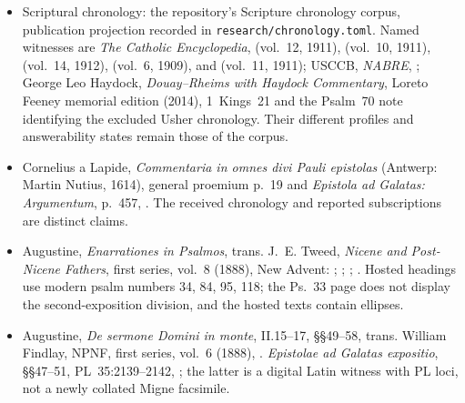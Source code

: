 {\begin{itemize}[leftmargin=1.1em,labelsep=0.35em,itemsep=0.22em,topsep=0.15em,parsep=0pt]
\item Scriptural chronology: the repository's Scripture chronology corpus,
publication projection recorded in \nolinkurl{research/chronology.toml}.
Named witnesses are \emph{The Catholic Encyclopedia},
 (vol.~12, 1911),
(vol.~10, 1911),
(vol.~14, 1912),
(vol.~6, 1909), and
(vol.~11, 1911); USCCB, \emph{NABRE},
;
George Leo Haydock, \emph{Douay--Rheims with Haydock Commentary}, Loreto
Feeney memorial edition (2014), 1~Kings~21 and the Psalm~70 note identifying
the excluded Usher chronology. Their different profiles and answerability
states remain those of the corpus.

\item Cornelius a Lapide, \emph{Commentaria in omnes divi Pauli epistolas}
(Antwerp: Martin Nutius, 1614), general proemium p.~19 and
\emph{Epistola ad Galatas: Argumentum}, p.~457,
.
The received chronology and reported subscriptions are distinct claims.

\item Augustine, \emph{Enarrationes in Psalmos}, trans. J.~E. Tweed,
\emph{Nicene and Post-Nicene Fathers}, first series, vol.~8 (1888),
New Advent: ;
;
;
.
Hosted headings use modern psalm numbers 34, 84, 95, 118; the Ps.~33 page
does not display the second-exposition division, and the hosted texts contain
ellipses.

\item Augustine, \emph{De sermone Domini in monte}, II.15--17, §§49--58,
trans. William Findlay, NPNF, first series, vol.~6 (1888),
.
\emph{Epistolae ad Galatas expositio}, §§47--51, PL~35:2139--2142,
;
the latter is a digital Latin witness with PL loci, not a newly collated
Migne facsimile.


\end{itemize}}
